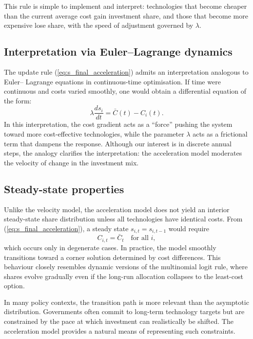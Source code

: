 \documentclass[preprint,authoryear,12pt]{elsarticle}
\begin{document}
This rule is simple to implement and interpret: technologies that become cheaper than the
current average cost gain investment share, and those that become more expensive lose share,
with the speed of adjustment governed by $\lambda$.

\subsection{Interpretation via Euler–Lagrange dynamics}

The update rule (\ref{eq:s_final_acceleration}) admits an interpretation analogous to Euler–
Lagrange equations in continuous-time optimisation. If time were continuous and costs varied
smoothly, one would obtain a differential equation of the form:
\begin{equation}
    \lambda \frac{d s_i}{dt} = \bar{C}(t) - C_i(t).
\end{equation}
In this interpretation, the cost gradient acts as a ``force'' pushing the system toward more
cost-effective technologies, while the parameter $\lambda$ acts as a frictional term that 
dampens the response. Although our interest is in discrete annual steps, the analogy clarifies the
interpretation: the acceleration model moderates the velocity of change in the investment mix.

\subsection{Steady-state properties}

Unlike the velocity model, the acceleration model does not yield an interior steady-state share
distribution unless all technologies have identical costs. From
(\ref{eq:s_final_acceleration}), a steady state $s_{i,t} = s_{i,t-1}$ would require
\begin{equation}
    C_{i,t} = \bar{C}_t
    \quad \text{for all } i,
\end{equation}
which occurs only in degenerate cases. In practice, the model smoothly transitions toward a
corner solution determined by cost differences. This behaviour closely resembles dynamic
versions of the multinomial logit rule, where shares evolve gradually even if the long-run 
allocation collapses to the least-cost option.

In many policy contexts, the transition path is more relevant than the asymptotic distribution.
Governments often commit to long-term technology targets but are constrained by the pace at
which investment can realistically be shifted. The acceleration model provides a natural means of
representing such constraints.
\end{document}
